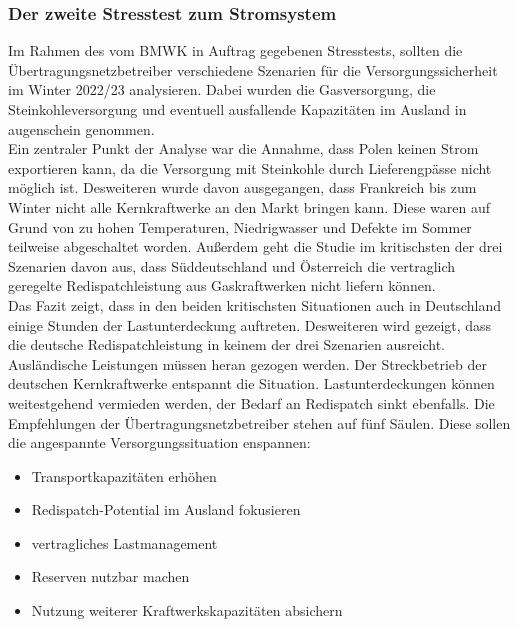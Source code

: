 		\subsubsection{Der zweite Stresstest zum Stromsystem}
		Im Rahmen des vom BMWK in Auftrag gegebenen Stresstests, sollten die Übertragungsnetzbetreiber verschiedene Szenarien für die Versorgungssicherheit im Winter 2022/23 analysieren. Dabei wurden die Gasversorgung, die Steinkohleversorgung und eventuell ausfallende Kapazitäten im Ausland in augenschein genommen.\\
		
		Ein zentraler Punkt der Analyse war die Annahme, dass Polen keinen Strom exportieren kann, da die Versorgung mit Steinkohle durch Lieferengpässe nicht möglich ist. Desweiteren wurde davon ausgegangen, dass Frankreich bis zum Winter nicht alle Kernkraftwerke an den Markt bringen kann. Diese waren auf Grund von zu hohen Temperaturen, Niedrigwasser und Defekte im Sommer teilweise abgeschaltet worden. Außerdem geht die Studie im kritischsten der drei Szenarien davon aus, dass Süddeutschland und Österreich die vertraglich geregelte Redispatchleistung aus Gaskraftwerken nicht liefern können. \\
		
		Das Fazit zeigt, dass in den beiden kritischsten Situationen auch in Deutschland einige Stunden der Lastunterdeckung auftreten. Desweiteren wird gezeigt, dass die deutsche Redispatchleistung in keinem der drei Szenarien ausreicht. Ausländische Leistungen müssen heran gezogen werden. Der Streckbetrieb der deutschen Kernkraftwerke entspannt die Situation. Lastunterdeckungen können weitestgehend vermieden werden, der Bedarf an Redispatch sinkt ebenfalls. Die Empfehlungen der Übertragungsnetzbetreiber stehen auf fünf Säulen. Diese sollen die angespannte Versorgungssituation enspannen:
			\begin{itemize}
				\item Transportkapazitäten erhöhen
				\item Redispatch-Potential im Ausland fokusieren
				\item vertragliches Lastmanagement
				\item Reserven nutzbar machen
				\item Nutzung weiterer Kraftwerkskapazitäten absichern
			\end{itemize}
		
